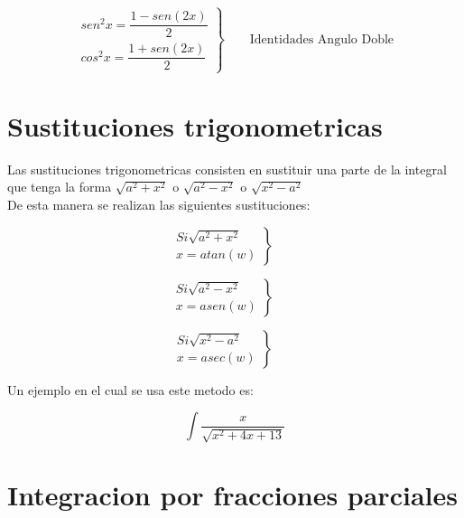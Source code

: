 \documentclass{article}
\begin{document}
\begin{equation}
\left.\begin{aligned}       
sen^2x=\dfrac{1-sen(2x)}{2}\\
cos^2x=\dfrac{1+sen(2x)}{2}
\end{aligned}
\right\}
\qquad \text{Identidades Angulo Doble}
\end{equation}
 
\section{Sustituciones trigonometricas}
 
Las sustituciones  trigonometricas consisten en sustituir una parte de la integral que tenga la forma $\sqrt{a^2+x^2}$ o $\sqrt{a^2-x^2}$ o $\sqrt{x^2-a^2}$\\
 
De esta manera se realizan las siguientes sustituciones:
 
\begin{equation}
\left.\begin{aligned}       
Si \sqrt{a^2+x^2}\\
x=atan(w)
\end{aligned}
\right\}
\qquad \text{}
\end{equation}
 
\begin{equation}
\left.\begin{aligned}       
Si \sqrt{a^2-x^2}\\
x=asen(w)
\end{aligned}
\right\}
\qquad \text{}
\end{equation}
 
\begin{equation}
\left.\begin{aligned}       
Si \sqrt{x^2-a^2}\\
x=asec(w)
\end{aligned}
\right\}
\qquad \text{}
\end{equation}
 
Un ejemplo en el cual se usa este metodo es:
 
\begin{equation}
\int{\dfrac{x}{\sqrt{x^2+4x+13}}}
\end{equation}
 
\section{Integracion por fracciones parciales}
 
\end{document}
